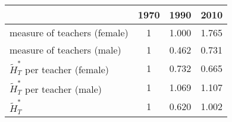 \begin{table}
  \centering \begin{tabular}{lccc}
\toprule
& 1970 & 1990 & 2010 \\
\midrule
measure of teachers (female) & 1 & 1.000 & 1.765\\
measure of teachers (male) & 1 & 0.462 & 0.731\\
$\widetilde{H}_T^*$ per teacher (female)   & 1 & 0.732 & 0.665 \\
$\widetilde{H}_T^*$ per teacher (male)   & 1 & 1.069 & 1.107 \\
$\widetilde{H}_T^*$ & 1  & 0.620 & 1.002 \\
\bottomrule
\end{tabular}
  \label{ }
\end{table}
